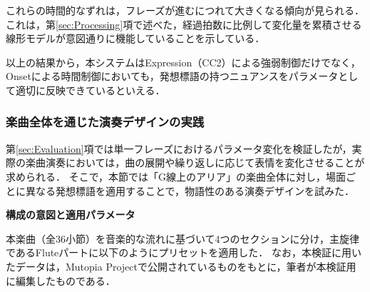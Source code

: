 これらの時間的なずれは，フレーズが進むにつれて大きくなる傾向が見られる．
これは，第\ref{sec:Processing}項で述べた，経過拍数に比例して変化量を累積させる線形モデルが意図通りに機能していることを示している．

以上の結果から，本システムはExpression（CC2）による強弱制御だけでなく，Onsetによる時間制御においても，発想標語の持つニュアンスをパラメータとして適切に反映できているといえる．

\subsubsection{楽曲全体を通じた演奏デザインの実践}
第\ref{sec:Evaluation}項では単一フレーズにおけるパラメータ変化を検証したが，実際の楽曲演奏においては，曲の展開や繰り返しに応じて表情を変化させることが求められる．
そこで，本節では「G線上のアリア」\cite{Air}の楽曲全体に対し，場面ごとに異なる発想標語を適用することで，物語性のある演奏デザインを試みた．

\noindent \textbf{構成の意図と適用パラメータ}

本楽曲（全36小節）を音楽的な流れに基づいて4つのセクションに分け，主旋律であるFluteパートに以下のようにプリセットを適用した．
なお，本検証に用いたデータは，Mutopia Projectで公開されているものをもとに，筆者が本検証用に編集したものである．

